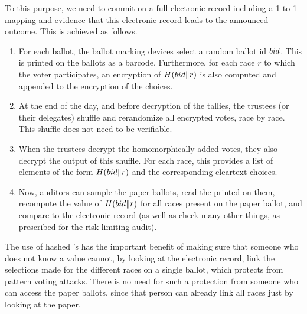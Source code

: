 To this purpose, we need to commit on a full electronic record
including a 1-to-1 mapping and evidence that this electronic record
leads to the announced outcome.
%
This is achieved as follows.
\begin{enumerate}
\item For each ballot, the ballot marking devices select a random ballot id
${bid}$. This \bid is printed on the ballots as a barcode. Furthermore,
for each race $r$ to which the voter participates, an encryption of
$H({bid} \| r)$ is also computed and appended to the encryption of the
choices.
\item At the end of the day, and before decryption of the tallies, the
  trustees (or their delegates) shuffle and rerandomize all encrypted
  votes, race by race. This shuffle does not need to be verifiable.
\item When the trustees decrypt the homomorphically added votes, they
  also decrypt the output of this shuffle. For each race, this
  provides a list of elements of the form $H({bid} \| r)$ and the
  corresponding cleartext choices.
\item Now, auditors can sample the paper ballots, read the \bid
  printed on them, recompute the value of $H({bid} \| r)$ for all races
  present on the paper ballot, and compare to the electronic record
  (as well as check many other things, as prescribed for the
  risk-limiting audit).
\end{enumerate}

The use of hashed \bid's has the important benefit of making sure that
someone who does not know a \bid value cannot, by looking at the
electronic record, link the selections made for the different races on
a single ballot, which protects from pattern voting attacks. There is
no need for such a protection from someone who can access the paper
ballots, since that person can already link all races just by looking
at the paper.

